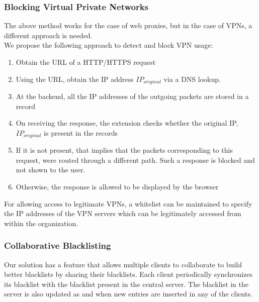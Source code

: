 \documentclass[a4paper,11pt,twocolumn]{article}
\begin{document}
\subsubsection{Blocking Virtual Private Networks}
The above method works for the case of web proxies, but in the case of VPNs, a different approach is needed.\\
We propose the following approach to detect and block VPN usage:
\begin{enumerate}
\item Obtain the URL of a HTTP/HTTPS request
\item Using the URL, obtain the IP address \begin{math}IP_{original}\end{math} via a DNS lookup.
\item At the backend, all the IP addresses of the outgoing packets are stored in a record
\item On receiving the response, the extension checks whether the original IP, \begin{math}IP_{original}\end{math} is present in the records
\item If it is not present, that implies that the packets corresponding to this request, were routed through a different path. Such a response is blocked and not shown to the user.
\item Otherwise, the response is allowed to be displayed by the browser
\end{enumerate}

For allowing access to legitimate VPNs, a whitelist can be maintained to specify the IP addresses of the VPN servers which can be legitimately accessed from within the organization.

\subsubsection{Collaborative Blacklisting}
Our solution has a feature that allows multiple clients to collaborate to build better blacklists by sharing their blacklists. Each client periodically synchronizes its blacklist with the blacklist present in the central server. The blacklist in the server is also updated as and when new entries are inserted in any of the clients.
\end{document}
